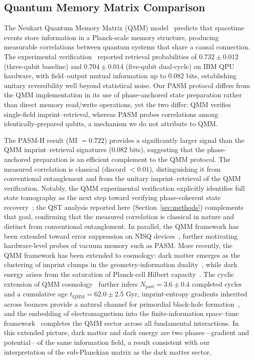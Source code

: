 ﻿\documentclass[12pt,a4paper]{article}
\begin{document}
\subsection{Quantum Memory Matrix Comparison}

The Neukart Quantum Memory Matrix (QMM) model~\cite{neukart2025,neukart2026qip} predicts that spacetime events store information in a Planck-scale memory structure, producing measurable correlations between quantum systems that share a causal connection. The experimental verification~\cite{neukart2026qip} reported retrieval probabilities of $0.732 \pm 0.012$ (three-qubit baseline) and $0.704 \pm 0.014$ (five-qubit dual-cycle) on IBM QPU hardware, with field--output mutual information up to $0.082$ bits, establishing unitary reversibility well beyond statistical noise. Our PASM protocol differs from the QMM implementation in its use of phase-anchored state preparation rather than direct memory read/write operations, yet the two differ: QMM verifies single-field imprint--retrieval, whereas PASM probes correlations among identically-prepared qubits, a mechanism we do not attribute to QMM.

The PASM-H result (MI $= 0.722$) provides a significantly larger signal than the QMM imprint--retrieval signatures ($0.082$ bits), suggesting that the phase-anchored preparation is an efficient complement to the QMM protocol. The measured correlation is classical (discord $< 0.01$), distinguishing it from conventional entanglement and from the unitary imprint--retrieval of the QMM verification. Notably, the QMM experimental verification explicitly identifies full state tomography as the next step toward verifying phase-coherent state recovery~\cite{neukart2026qip}; the QST analysis reported here (Section~\ref{sec:methods}) complements that goal, confirming that the measured correlation is classical in nature and distinct from conventional entanglement. In parallel, the QMM framework has been extended toward error suppression on NISQ devices~\cite{neukart2026qec}, further motivating hardware-level probes of vacuum memory such as PASM. More recently, the QMM framework has been extended to cosmology: dark matter emerges as the clustering of imprint clumps in the geometry-information duality~\cite{neukart2025dm}, while dark energy arises from the saturation of Planck-cell Hilbert capacity~\cite{neukart2025de}. The cyclic extension of QMM cosmology~\cite{neukart2025cycle} further infers $N_{\mathrm{past}} = 3.6 \pm 0.4$ completed cycles and a cumulative age $t_{\mathrm{QMM}} = 62.0 \pm 2.5$ Gyr, imprint-entropy gradients inherited across bounces provide a natural channel for primordial black-hole formation~\cite{neukart2025pbh}, and the embedding of electromagnetism into the finite-information space--time framework~\cite{neukart2026em} completes the QMM sector across all fundamental interactions. In this extended picture, dark matter and dark energy are two phases---gradient and potential---of the same information field, a result consistent with our interpretation of the sub-Planckian matrix as the dark matter sector.
\end{document}
